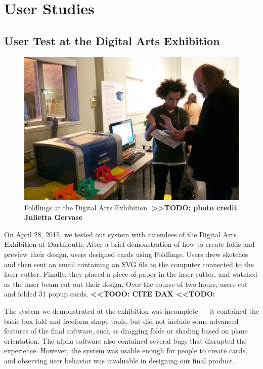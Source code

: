 \chapter{User Studies}

\section{User Test at the Digital Arts
Exhibition}\label{user-test-at-the-digital-arts-exhibition}

\begin{figure}[htbp]
\centering
\includegraphics{figures/50_User_Study_Dax/dax_facebook_credit_Julietta_Gervase}
\caption{Foldlings at the Digital Arts Exhibition.
\textbf{\textgreater{}\textgreater{}TODO: photo credit Julietta
Gervase}}
\end{figure}

On April 28, 2015, we tested our system with attendees of the Digital
Arts Exhibition at Dartmouth. After a brief demonstration of how to
create folds and preview their design, users designed cards using
Foldlings. Users drew sketches and then sent an email containing an SVG
file to the computer connected to the laser cutter. Finally, they placed
a piece of paper in the laser cutter, and watched as the laser beam cut
out their design. Over the course of two hours, users cut and folded 31
popup cards. \textbf{\textless{}\textless{}TOOO: CITE DAX
\textless{}\textless{}TODO:}

The system we demonstrated at the exhibition was incomplete --- it
contained the basic box fold and freeform shape tools, but did not
include some advanced features of the final software, such as dragging
folds or shading based on plane orientation. The alpha software also
contained several bugs that disrupted the experience. However, the
system was usable enough for people to create cards, and observing user
behavior was invaluable in designing our final product.

